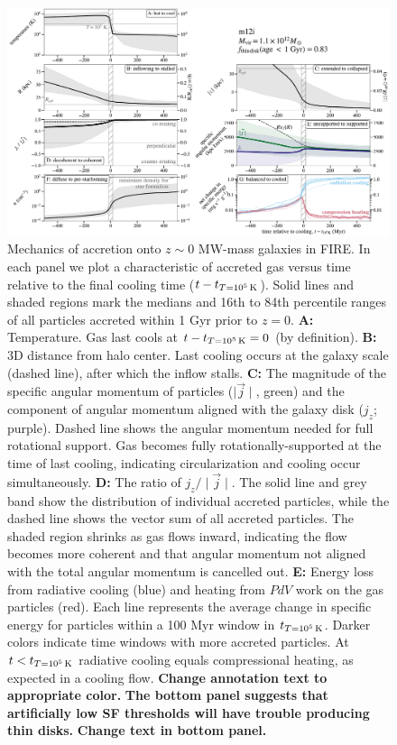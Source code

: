 \documentclass[fleqn,usenatbib]{mnras}
\newcommand{\tcon}{t_{T=10^5\,{\rm K}}}
\begin{document}
\begin{figure}
\includegraphics[width=\textwidth]{figures/before_and_after/before_and_after_m12i_md.pdf}
\caption{
Mechanics of accretion onto $z\sim0$ MW-mass galaxies in FIRE.
In each panel we plot a characteristic of accreted gas versus time relative to the final cooling time ($t - \tcon$).
Solid lines and shaded regions mark the medians and 16th to 84th percentile ranges of all particles accreted within 1 Gyr prior to $z=0$.
\textbf{A:} Temperature. Gas last cools at $t - \tcon = 0$ (by definition).
\textbf{B:}
3D distance from halo center. 
Last cooling occurs at the galaxy scale (dashed line), after which the inflow stalls.
\textbf{C:}
The magnitude of the specific angular momentum of particles ($\mid\vec{j}\mid$, green) and the component of angular momentum aligned with the galaxy disk ($j_z$; purple).
Dashed line shows the angular momentum needed for full rotational support.
Gas becomes fully rotationally-supported at the time of last cooling, indicating circularization and cooling occur simultaneously.
\textbf{D:}
The ratio of $j_z / \mid \vec j \mid$.
The solid line and grey band show the distribution of individual accreted particles, while the dashed line shows the vector sum of all accreted particles.
The shaded region shrinks as gas flows inward, indicating the flow becomes more coherent and that angular momentum not aligned with the total angular momentum is cancelled out. 
\textbf{E:}
Energy loss from radiative cooling (blue) and heating from $PdV$ work on the gas particles (red).
Each line represents the average change in specific energy for particles within a 100 Myr window in $\tcon$.
Darker colors indicate time windows with more accreted particles.
At $t<\tcon$ radiative cooling equals compressional heating, as expected in a cooling flow. 
\textbf{
Change annotation text to appropriate color.
}
\textbf{The bottom panel suggests that artificially low SF thresholds will have trouble producing thin disks.}
\textbf{Change text in bottom panel.}
}
\label{f: before and after}
\end{figure}
\end{document}
